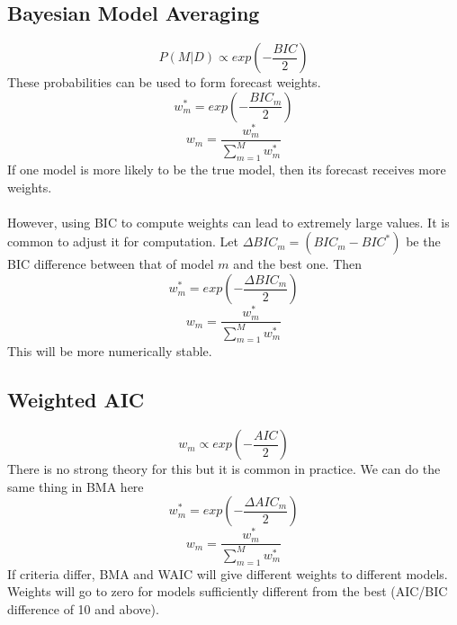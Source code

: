 \documentclass{article}
\begin{document}
\subsection{Bayesian Model Averaging}
$$P(M|D) \propto exp(-\frac{BIC}{2})$$
These probabilities can be used to form forecast weights.
$$w_m^* = exp(-\frac{BIC_m}{2})$$
$$w_m = \frac{w_m^*}{\sum_{m=1}^M w_m^*}$$
If one model is more likely to be the true model, then its forecast receives more weights.\\
\\
However, using BIC to compute weights can lead to extremely large values. It is common to adjust it for computation. Let $\Delta BIC_m = (BIC_m - BIC^*)$ be the BIC difference between that of model $m$ and the best one. Then
$$w_m^* = exp(-\frac{\Delta BIC_m}{2})$$
$$w_m = \frac{w_m^*}{\sum_{m=1}^M w_m^*}$$
This will be more numerically stable.

\subsection{Weighted AIC}
$$w_m \propto exp(-\frac{AIC}{2})$$
There is no strong theory for this but it is common in practice. We can do the same thing in BMA here
$$w_m^* = exp(-\frac{\Delta AIC_m}{2})$$
$$w_m = \frac{w_m^*}{\sum_{m=1}^M w_m^*}$$
If criteria differ, BMA and WAIC will give different weights to different models. Weights will go to zero for models sufficiently different from the best (AIC/BIC difference of 10 and above).
\end{document}
